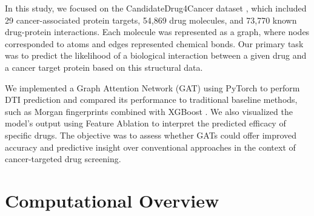 \documentclass[fontsize=11pt]{article}
\begin{document}
In this study, we focused on the CandidateDrug4Cancer dataset \cite{Ye2022}, which included 29 cancer-associated protein targets, 54,869 drug molecules, and 73,770 known drug-protein interactions. Each molecule was represented as a graph, where nodes corresponded to atoms and edges represented chemical bonds. Our primary task was to predict the likelihood of a biological interaction between a given drug and a cancer target protein based on this structural data.

We implemented a Graph Attention Network (GAT) using PyTorch \cite{Velickovic2018} to perform DTI prediction and compared its performance to traditional baseline methods, such as Morgan fingerprints \cite{Rogers2010} combined with XGBoost \cite{ChenGuestrin2016}. We also visualized the model’s output using Feature Ablation to interpret the predicted efficacy of specific drugs. The objective was to assess whether GATs could offer improved accuracy and predictive insight over conventional approaches in the context of cancer-targeted drug screening.

\section*{Computational Overview}
\end{document}
